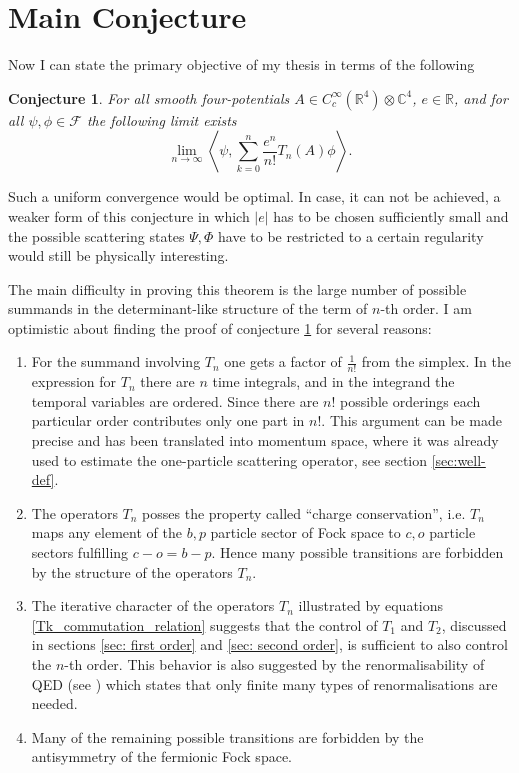 \documentclass[b5paper,draft,openbib,12pt]{memoir}
\newtheorem{Conj}[Def]{Conjecture}
\begin{document}
\section{Main Conjecture}\label{sec:main result}
Now I can state the primary objective of my thesis in terms of the following
\begin{Conj}\label{main_result}
For all smooth four-potentials \(A\in C_{c}^\infty(\mathbb{R}^4)\otimes
\mathbb{C}^4\),
\(e \in \mathbb{R}\), and for all \(\psi, \phi \in
\mathcal{F}\) the following limit exists
\begin{equation}
\lim_{n\rightarrow \infty} \left\langle \psi, \sum_{k=0}^n  \frac{e^n}{n!} T_n (A)\phi \right\rangle.
\end{equation}
\end{Conj}

Such a uniform convergence would be optimal. In case, it can not be achieved, a
weaker form of this conjecture in which $|e|$ has to be chosen sufficiently
small and the possible scattering states $\Psi,\Phi$ have to be restricted to a
certain regularity would still be physically interesting.

The main difficulty in proving this theorem is the large number of  possible
summands in the determinant-like structure of the term of \(n\)-th order.  I am
optimistic about finding the proof of conjecture \ref{main_result} for several
reasons:

\begin{enumerate}
\item For the summand involving \(T_n\) one gets a factor of \(\frac{1}{n!}\)
    from the simplex. In the expression for \(T_n\) there are \(n\) time
    integrals, and in the integrand the temporal variables are ordered. Since
    there are \(n!\) possible orderings each particular order contributes only
    one part in \(n!\). This argument can be made precise and has been
    translated into momentum space, where it was already used to estimate the
    one-particle scattering operator, see section \ref{sec:well-def}.
\item The operators \(T_n\) posses the property called ``charge conservation'',
    i.e. \(T_n\) maps any element of the \(b,p\) particle sector of Fock space
    to \(c,o\) particle sectors fulfilling \(c-o=b-p\). Hence many possible
    transitions are forbidden by the structure of the operators \(T_n\).
\item The iterative character of the operators \(T_n\) illustrated by equations \eqref{Tk_commutation_relation}
    suggests that the control of $T_1$ and $T_2$, discussed in sections \ref{sec: first order} and 
    \ref{sec: second order}, is sufficient to also control the $n$-th
    order. This behavior is also suggested by the renormalisability of QED (see \cite[Chapter
    4.3]{scharf2014finite}) which states that only finite many types of renormalisations
    are needed.
\item Many of the remaining possible transitions are forbidden by the
    antisymmetry of the fermionic Fock space.
\end{enumerate}
\end{document}
